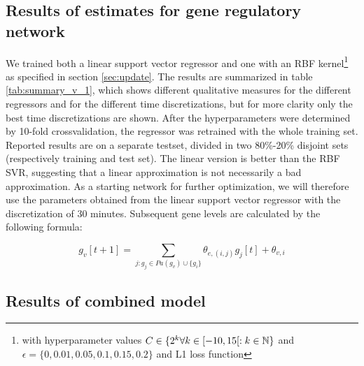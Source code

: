 \subsection{Results of estimates for gene regulatory network}
We trained both a linear support vector regressor and one with an RBF kernel\footnote{with hyperparameter values $C \in \{ 2^k \forall k \in [-10,15[ : k \in \mathbb{N} \}$ and 
$\epsilon = \{0,0.01,0.05,0.1,0.15,0.2\}$ and L1 loss function} as specified in section \ref{sec:update}.
The results are summarized in table \ref{tab:summary_v_1}, which shows different qualitative measures for the different regressors and for the different time discretizations, but for more clarity only the best time discretizations are shown.
After the hyperparameters were determined by 10-fold crossvalidation, the regressor was retrained with the whole training set. Reported results are on a separate testset, divided in two 80\%-20\% disjoint sets (respectively training and test set).
The linear version is better than the RBF SVR, suggesting that a linear approximation is not necessarily a bad approximation. As a starting network for further optimization, we will therefore use the parameters obtained from the linear support vector
regressor with the discretization of 30 minutes.
Subsequent gene levels are calculated by the following formula:

\begin{equation}\label{eq:gene_update}
 g_v[t+1] = \sum_{j : g_j \in Pa(g_v) \cup \{g_i\} } \theta_{e,(i,j)}g_j[t] + \theta_{v,i}
\end{equation}


\subsection{ Results of combined model }
